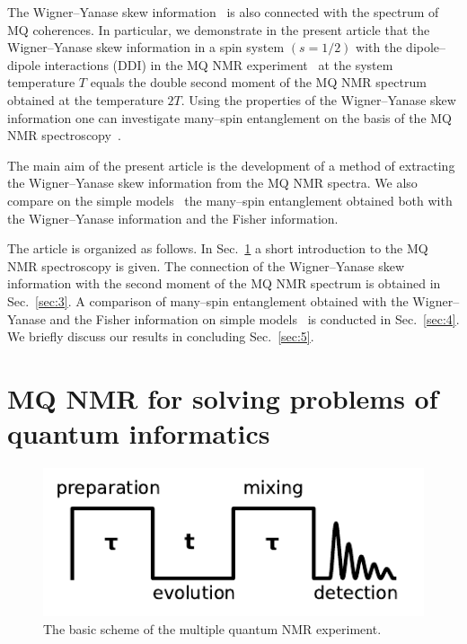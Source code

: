 \documentclass[preprint,12pt]{elsarticle}
\begin{document}
The Wigner--Yanase skew information~\cite{1,2,3,4} is also connected with the spectrum of MQ coherences.
In particular, we demonstrate in the present article that the Wigner--Yanase skew information in a spin system $(s = 1/2)$ with the dipole--dipole interactions (DDI) in the MQ NMR experiment~\cite{10} at the system temperature $T$ equals the double second moment of the MQ NMR spectrum obtained at the temperature $2T$.
Using the properties of the Wigner--Yanase skew information one can investigate many--spin entanglement on the basis of the MQ NMR spectroscopy~\cite{10}.


The main aim of the present article is the development of a method of extracting the Wigner--Yanase skew information from the MQ NMR spectra.
We also compare on the simple models~\cite{8,16} the many--spin entanglement obtained both with the Wigner--Yanase information and the Fisher information.


The article is organized as follows.
In Sec.~\ref{sec:2} a short introduction to the MQ NMR spectroscopy is given.
The connection of the Wigner--Yanase skew information with the second moment of the MQ NMR spectrum is obtained in Sec.~\ref{sec:3}.
A comparison of many--spin entanglement obtained with the Wigner--Yanase and the Fisher information on simple models~\cite{8,16} is conducted in Sec.~\ref{sec:4}.
We briefly discuss our results in concluding Sec.~\ref{sec:5}.


\section{MQ NMR for solving problems of quantum informatics}
\label{sec:2}


\begin{figure}
	\includegraphics[width=0.95\linewidth]{mq-experiment}
	\caption{The basic scheme of the multiple quantum NMR experiment.}
	\label{fig:1}
\end{figure}
\end{document}
